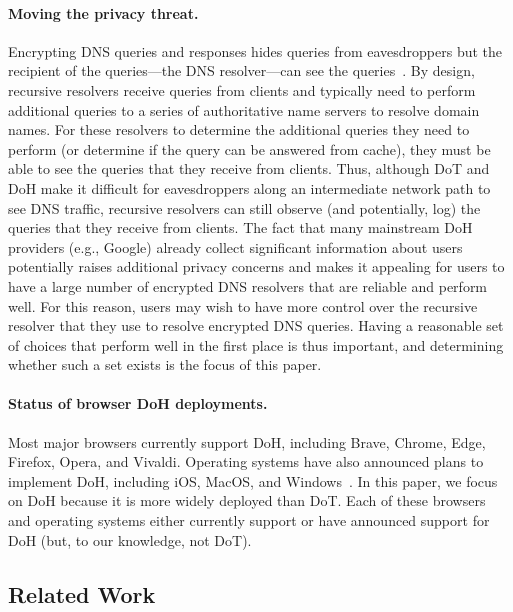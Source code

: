 \paragraph{Moving the privacy threat.} Encrypting DNS queries and responses hides queries
from eavesdroppers but the recipient of the queries---the DNS resolver---can
see the queries~\cite{IEEEfight}. By design, recursive resolvers receive
queries from clients and typically need to perform additional queries to a
series of authoritative name servers to resolve domain names.  For these
resolvers to determine the additional queries they need to perform (or
determine if the query can be answered from cache), they must be able to see
the queries that they receive from clients.  Thus, although DoT and DoH make
it difficult for eavesdroppers along an intermediate network path to see DNS
traffic, recursive resolvers can still observe (and potentially, log) the
queries that they receive from clients.  The fact that many mainstream DoH
providers (e.g., Google) already collect significant information about users
potentially raises additional privacy concerns and makes it appealing for
users to have a large number of encrypted DNS resolvers that are reliable and
perform well. For this reason, users may wish to have more control over the
recursive resolver that they use to resolve encrypted DNS queries. Having
a reasonable set of choices that perform well in the first place is thus
important, and determining whether such a set exists is the focus of this
paper.

\paragraph{Status of browser DoH deployments.}
Most major browsers currently support DoH, including Brave, Chrome, Edge,
Firefox, Opera, and Vivaldi. Operating systems have also announced
plans to implement DoH, including iOS, MacOS, and
Windows~\cite{ffSettings,operaEdgeSettings,vivaldiSettings,iosSettings,jensen2020windows}.
In this paper, we focus on DoH because it is more widely deployed
than DoT.  Each of these browsers and operating systems either
currently support or have announced support for DoH (but, to our knowledge, not
DoT).

\subsection{Related Work}

